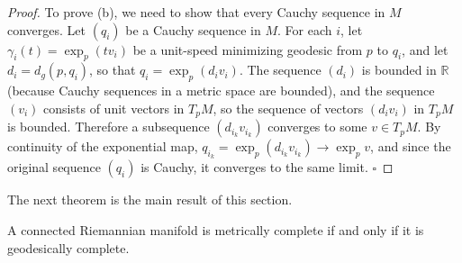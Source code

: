 \begin{proof}
To prove (b), we need to show that every Cauchy sequence in $M$ converges. Let $(q_i)$ be a Cauchy sequence in $M$. For each $i$, let $\gamma_i(t) = \exp_p(tv_i)$ be a unit-speed minimizing geodesic from $p$ to $q_i$, and let $d_i = d_g(p, q_i)$, so that $q_i = \exp_p(d_i v_i)$. The sequence $(d_i)$ is bounded in $\mathbb{R}$ (because Cauchy sequences in a metric space are bounded), and the sequence $(v_i)$ consists of unit vectors in $T_p M$, so the sequence of vectors $(d_i v_i)$ in $T_p M$ is bounded. Therefore a subsequence $(d_{i_k} v_{i_k})$ converges to some $v \in T_p M$. By continuity of the exponential map, $q_{i_k} = \exp_p(d_{i_k} v_{i_k}) \to \exp_p v$, and since the original sequence $(q_i)$ is Cauchy, it converges to the same limit. $\square$
\end{proof}

The next theorem is the main result of this section.

\begin{theorem}
\label{thm:hopf-rinow}

A connected Riemannian manifold is metrically complete if and only if it is geodesically complete.
\end{theorem}

